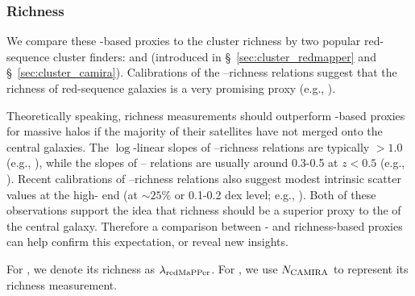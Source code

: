 \documentclass[fleqn,usenatbib,useAMS]{mnras}
\begin{document}
\begin{CJK*}{UTF8}{gbsn}


\subsubsection{Richness}
    \label{sec:proxy_richness}

    We compare these \mstar{}-based proxies to the cluster richness by two popular red-sequence
    cluster finders: \redm{} and \camira{} (introduced in \S\ \ref{sec:cluster_redmapper} and \S\
    \ref{sec:cluster_camira}).
    Calibrations of the \mvir{}--richness relations suggest that the richness of red-sequence
    galaxies is a very promising \mvir{} proxy (e.g., \citealt{Melchior2017, Murata2018,
    McClintock2019}).
    
    Theoretically speaking, richness measurements should outperform \mstar{}-based \mvir{} proxies
    for massive halos if the majority of their satellites have not merged onto the central galaxies.
    The $\log$-linear slopes of \mvir{}--richness relations are typically $> 1.0$ (e.g.,
    \citealt{Saro2015, Mantz2016, Farahi2016, Simet2017, Baxter2018, Melchior2017, McClintock2019}),
    while the slopes of \mvir{}--\mstar{} relations are usually around 0.3-0.5 at $z<0.5$ (e.g.,
    \citealt{RodriguezPuebla2017, Tinker2017, Moster2018, Kravtsov2018, Huang2020}).
    Recent calibrations of \mvir{}--richness relations also suggest modest intrinsic scatter values
    at the high-\mvir{} end (at $\sim 25$\% or 0.1-0.2 dex level; e.g., \citealt{Rykoff2014,
    Saro2015, Simet2017}).
    Both of these observations support the idea that richness should be a superior \mvir{} proxy to
    the \mstar{} of the central galaxy.
    Therefore a \topn{} comparison between \mstar{}- and richness-based proxies can help confirm
    this expectation, or reveal new insights.

    For \redm{}, we denote its richness as $\lambda_{\rm redMaPPer}$. 
    For \camira{}, we use $N_{\rm CAMIRA}$ to represent its richness measurement.


\end{CJK*}
\end{document}
